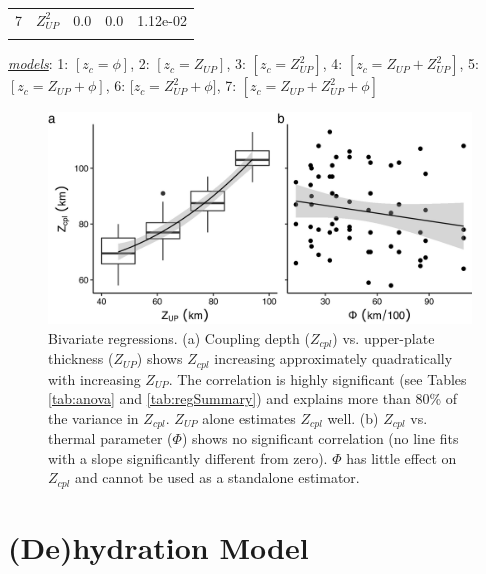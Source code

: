 \begin{table}
\begin{threeparttable}
\begin{tabular}[t]{llrrl}
7 & $Z_{UP}^2$ & 0.0 & 0.0 & 1.12e-02\\
\cellcolor{gray!6}{7} & \cellcolor{gray!6}{$\phi$} & \cellcolor{gray!6}{-0.1} & \cellcolor{gray!6}{0.0} & \cellcolor{gray!6}{7.28e-04}\\
\bottomrule
\end{tabular}
\begin{tablenotes}
\item \uline{\textit{models}}: 1: $[z_c=\phi]$, 2: $[z_c=Z_{UP}]$, 3: $[z_c=Z_{UP}^2]$, 4: $[z_c=Z_{UP}+Z_{UP}^2]$, 5: $[z_c=Z_{UP}+\phi]$, 6: [$z_c=Z_{UP}^2+\phi]$, 7: $[z_c=Z_{UP}+Z_{UP}^2+\phi]$
\end{tablenotes}
\end{threeparttable}
\end{table}

\begin{figure}[htbp]

{\centering \includegraphics[width=1\linewidth,]{assets/figs/chpt2/figA6} 

}

\caption[Bivariate regressions of coupling results]{Bivariate regressions. (a) Coupling depth ($Z_{cpl}$) vs. upper-plate thickness ($Z_{UP}$) shows $Z_{cpl}$ increasing approximately quadratically with increasing $Z_{UP}$. The correlation is highly significant (see Tables \ref{tab:anova} and \ref{tab:regSummary}) and explains more than 80\% of the variance in $Z_{cpl}$. $Z_{UP}$ alone estimates $Z_{cpl}$ well. (b) $Z_{cpl}$ vs. thermal parameter ($\Phi$) shows no significant correlation (no line fits with a slope significantly different from zero). $\Phi$ has little effect on $Z_{cpl}$ and cannot be used as a standalone estimator.}\label{fig:biv}
\end{figure}

\clearpage

\hypertarget{deHydration}{%
\section{(De)hydration Model}\label{deHydration}}

